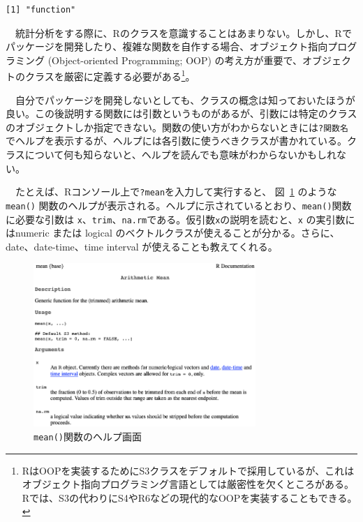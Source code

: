 \documentclass[
  a4paper,
  pandoc,
  ja=standard,
  jafont=haranoaji]{bxjsbook}
\begin{document}
\begin{verbatim}
[1] "function"
\end{verbatim}

　統計分析をする際に、Rのクラスを意識することはあまりない。しかし、Rでパッケージを開発したり、複雑な関数を自作する場合、オブジェクト指向プログラミング
(Object-oriented Programming; OOP)
の考え方が重要で、オブジェクトのクラスを厳密に定義する必要がある\footnote{RはOOPを実装するためにS3クラスをデフォルトで採用しているが、これはオブジェクト指向プログラミング言語としては厳密性を欠くところがある。Rでは、S3の代わりにS4やR6などの現代的なOOPを実装することもできる。}。

　自分でパッケージを開発しないとしても、クラスの概念は知っておいたほうが良い。この後説明する関数には引数というものがあるが、引数には特定のクラスのオブジェクトしか指定できない。関数の使い方がわからないときには\texttt{?関数名}
でヘルプを表示するが、ヘルプには各引数に使うべきクラスが書かれている。クラスについて何も知らないと、ヘルプを読んでも意味がわからないかもしれない。

　たとえば、Rコンソール上で\texttt{?mean}を入力して実行すると、
図~\ref{fig-programming_help} のような \texttt{mean()}
関数のヘルプが表示される。ヘルプに示されているとおり、\texttt{mean()}関数に必要な引数は
\texttt{x}、\texttt{trim}、\texttt{na.rm}である。仮引数\texttt{x}の説明を読むと、\texttt{x}
の実引数にはnumeric または logical
のベクトルクラスが使えることが分かる。さらに、date、date-time、time
interval が使えることも教えてくれる。

\begin{figure}

{\centering \includegraphics[width=0.75\textwidth,height=\textheight]{./Figs/Programming/help.png}

}

\caption{\label{fig-programming_help}\texttt{mean()}関数のヘルプ画面}

\end{figure}
\end{document}
